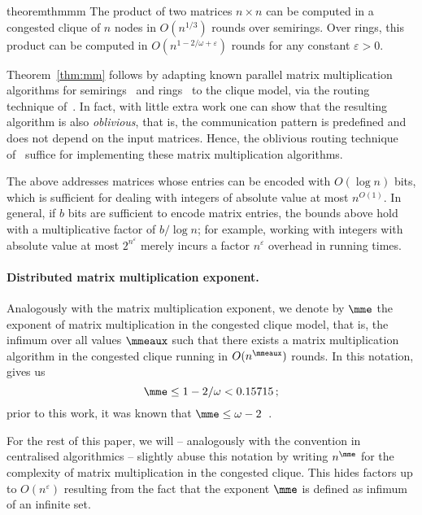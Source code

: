 \begin{restatable}{theorem}{thmmm}\label{thm:mm}
The product of two matrices $n \times n$ can be computed in a congested clique of $n$ nodes in
$O(n^{1/3})$ rounds over semirings. Over rings, this product can be computed in $O(n^{1-2/\omega+\varepsilon})$ rounds for any constant $\varepsilon>0$.
\end{restatable}

Theorem~\ref{thm:mm} follows by adapting known parallel matrix multiplication algorithms for semirings~\cite{AgarwalBGJP95_3d,mccoll1995scalable} and rings~\cite{LuoD95_layout_parallel,mccoll1996,tiskin-phd,BallardDHLS12_Strassen_upper} to the clique model, via the routing technique of~\citet{lenzen2013optimal}. In fact, with little extra work one can show that the resulting algorithm is also \emph{oblivious}, that is, the communication pattern is predefined and does not depend on the input matrices.
Hence, the oblivious routing technique of~\citet{tritri} suffice for implementing these matrix multiplication algorithms.

The above addresses matrices whose entries can be encoded with $O(\log n)$ bits, which is sufficient for dealing with integers of absolute value at most $n^{O(1)}$. In general, if $b$ bits are sufficient to encode matrix entries, the bounds above hold with a multiplicative factor of $b / \log n$; for example, working with integers with absolute value at most $2^{n^{\varepsilon}}$ merely incurs a factor $n^{\varepsilon}$ overhead in running times.

\paragraph{Distributed matrix multiplication exponent.}
Analogously with the matrix multiplication exponent, we denote by $\mme$ the exponent of matrix multiplication in the congested clique model, that is, the infimum over all values $\mmeaux$ such that there exists a matrix multiplication algorithm in the congested clique running in $O(n^{\mmeaux})$ rounds. In this notation,  gives us
\[ \mme \le 1 - 2/\omega < 0.15715\,;\]
prior to this work, it was known that $\mme \leq \omega-2$~\cite{drucker13}.

For the rest of this paper, we will -- analogously with the convention in centralised algorithmics -- slightly abuse this notation by writing $n^\mme$ for the complexity of matrix multiplication in the congested clique. This hides factors up to $O(n^\varepsilon)$ resulting from the fact that the exponent $\mme$ is defined as infimum of an infinite set.


